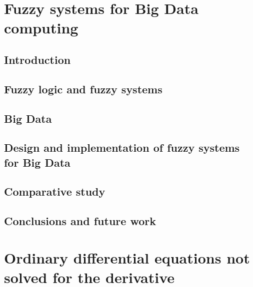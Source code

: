 \documentclass[
  fontsize=12pt,
  a4paper,  %
  twoside,  %
  bibliography=totoc,
  headsepline,
  cleardoublepage=empty,
  draft=false
]{scrbook}
\theoremstyle{nonumberplain}
\begin{document}
%
%
\mainmatter

\part{Fuzzy systems for Big Data computing}
\label{part:cs}

\chapter{Introduction}


\chapter{Fuzzy logic and fuzzy systems}
\label{ch:fuzzy}


\chapter{Big Data}
\label{ch:bigdata}


\chapter{Design and implementation of fuzzy systems for Big Data}
\label{ch:implementation}


\chapter{Comparative study}
\label{ch:study}


\chapter{Conclusions and future work}


\part{Ordinary differential equations not solved for the derivative}
\label{part:maths}
\end{document}
